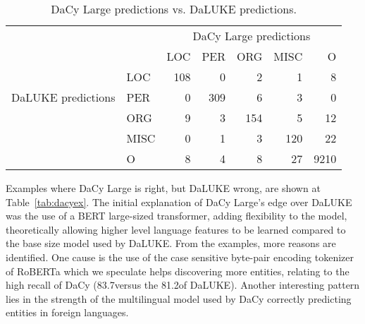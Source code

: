 \documentclass[main.tex]{subfiles}
\begin{document}
\begin{table}[H]
    \centering
    \begin{tabular}{l l | r r r r r }
        & &	\multicolumn{5}{c}{DaCy Large predictions}	\\
        \multirow{5}{*}{DaLUKE predictions} & & LOC & PER & ORG & MISC & O \\\hline
           & LOC                             &  108 & 0   & 2   & 1    & 8\\
           & PER                             &  0   & 309 & 6   & 3    & 0\\
           & ORG                             &  9   & 3   & 154 & 5    & 12\\
           & MISC                            &  0   & 1   & 3   & 120  & 22\\
           & O                               &  8   & 4   & 8   & 27   & 9210
    \end{tabular}
    \label{tab:dacycompare}
    \caption{
        DaCy Large predictions vs. DaLUKE predictions.
    }
\end{table}\noindent
Examples where DaCy Large is right, but DaLUKE wrong, are shown at Table~\ref{tab:dacyex}.
The initial explanation of DaCy Large's edge over DaLUKE was the use of a BERT large-sized transformer, adding flexibility to the model, theoretically allowing higher level language features to be learned compared to the base size model used by DaLUKE.
From the examples, more reasons are identified.
One cause is the use of the case sensitive byte-pair encoding tokenizer of RoBERTa \cite{conneau2020unsupervised} which we speculate helps discovering more entities, relating to the high recall of DaCy (83.7\pro versus the 81.2\pro of DaLUKE).
Another interesting pattern lies in the strength of the multilingual model used by DaCy correctly predicting entities in foreign languages.
\end{document}
